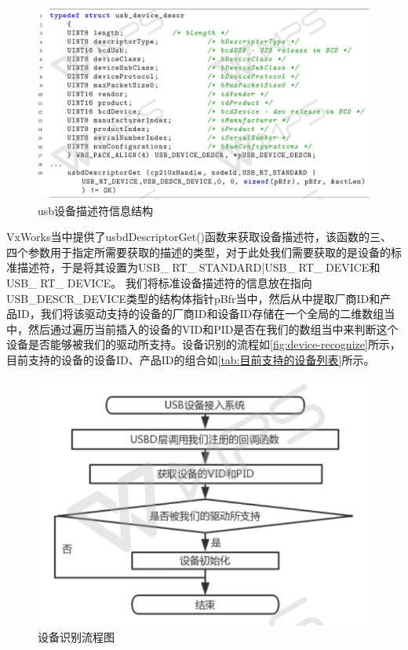 \begin{figure}[!h]
\centering
\includegraphics[width=1.0\textwidth]{./graphics/usdbDescriptorGet.pdf}
\caption{usb设备描述符信息结构}\label{fig:usdbDescriptorGet}
\end{figure}

VxWorks当中提供了usbdDescriptorGet()函数来获取设备描述符，该函数的三、四个参数用于指定所需要获取的描述的类型，对于此处我们需要获取的是设备的标准描述符，于是将其设置为USB\_ RT\_ STANDARD|USB\_ RT\_ DEVICE和USB\_ RT\_ DEVICE。
	我们将标准设备描述符的信息放在指向USB_DESCR_DEVICE类型的结构体指针pBfr当中，然后从中提取厂商ID和产品ID，我们将该驱动支持的设备的厂商ID和设备ID存储在一个全局的二维数组当中，然后通过遍历当前插入的设备的VID和PID是否在我们的数组当中来判断这个设备是否能够被我们的驱动所支持。设备识别的流程如\autoref{fig:device-recognize}所示，目前支持的设备的设备ID、产品ID的组合如\autoref{tab:目前支持的设备列表}所示。
\begin{figure}[!h]
\centering
\includegraphics[width=1.0\textwidth]{./graphics/device-recognize.pdf}
\caption{设备识别流程图}\label{fig:device-recognize}
\end{figure}

